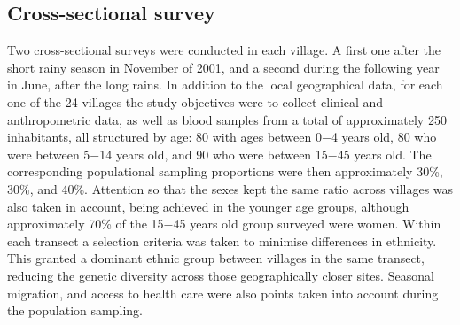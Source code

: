 \subsection{Cross-sectional survey}

Two cross-sectional surveys were conducted in each village.
A first one after the short rainy season in November of 2001, and a second during the following year in June, after the long rains.
In addition to the local geographical data, for each one of the 24 villages the study objectives were to collect clinical and anthropometric data, as well as blood samples from a total of approximately 250 inhabitants, all structured by age: 80 with ages between 0$-$4 years old, 80 who were between 5$-$14 years old, and 90 who were between 15$-$45 years old.
The corresponding populational sampling proportions were then approximately 30\%, 30\%, and 40\%. 
Attention so that the sexes kept the same ratio across villages was also taken in account, being achieved in the younger age groups, although approximately 70\% of the 15$-$45 years old group surveyed were women.
Within each transect a selection criteria was taken to minimise differences in ethnicity.
This granted a dominant ethnic group between villages in the same transect, reducing the genetic diversity across those geographically closer sites.
Seasonal migration, and access to health care were also points taken into account during the population sampling.

